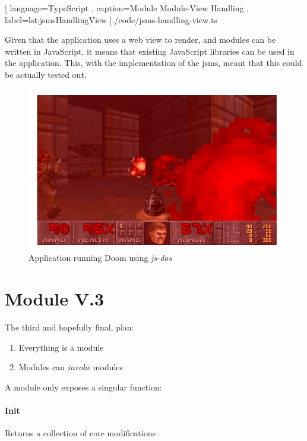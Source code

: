 \begin{center}
  
    [ language=TypeScript
    , caption={Module Module-View Handling}
    , label=lst:jsmsHandlingView
    ]{./code/jsms-handling-view.ts}
\end{center}

Given that the application uses a web view to render, and modules can be written
in JavaScript, it means that existing JavaScript libraries can be used in the
application. This, with the implementation of the \gls{jsms}, meant that this
could be actually tested out.


\begin{figure}
  \centering
  \includegraphics[scale=0.5]{./pics/doom}
  \caption{Application running Doom using \textit{js-dos}}
  \label{fig:doom}
\end{figure}

\section{Module V.3}

The third and hopefully final, plan:

\begin{enumerate}
  \item Everything is a module
  \item Modules can \textit{invoke} modules
\end{enumerate}

A module only exposes a singular function:

\paragraph{Init} Returns a collection of core modifications

